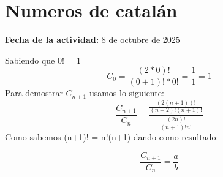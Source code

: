 \documentclass[../portafolio.tex]{subfiles}
\begin{document}
\chapter{Numeros de catalán}
\hfill \textbf{Fecha de la actividad:} 8 de octubre de 2025

Sabiendo que 0! = 1
\begin{equation}
    C_0 = \frac{(2*0)!}{(0+1)!*0!} =\frac{1}{1} = 1     
\end{equation}
Para demostrar $C_{n+1}$ usamos lo siguiente:
\begin{equation}
    \frac{C_{n+1}}{C_n} = \frac{\frac{(2(n+1))!}{(n+2)!(n+1)!}}{\frac{(2n)!}{(n+1)!n!}}
\end{equation}
Como sabemos (n+1)! = n!(n+1) dando como resultado:

\begin{equation}
    \frac{C_{n+1} }{C_n}= \frac{a}{b}
\end{equation}
\end{document}
